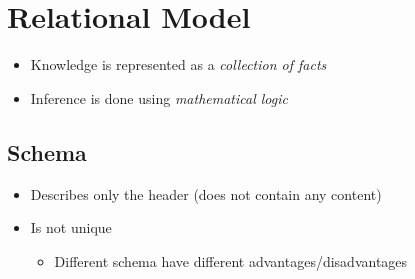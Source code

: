 
\section{Relational Model}
\begin{itemize}
    \item Knowledge is represented as a \textit{collection of facts}
    \item Inference is done using \textit{mathematical logic}
\end{itemize}

\subsection{Schema}
\begin{itemize}
        \begin{itemize}
            \item Set of relation schema
        \end{itemize}
        \begin{itemize}
            \item ``Represented'' as a table
            \item Has a name
            \item Contains a set of fields/attributes
            \item Sometimes referred to as \textit{Relation}
            \item Described as $\text{R}(\text{f}_1: \text{D}_1, \dots, \text{f}_n:\text{D}_n)$
                \begin{itemize}
                     relation name
                     name of field $i$
                     domain of field $i$
                \end{itemize}
        \end{itemize}
        \begin{itemize}
            \item ``Represented'' as a single columns of the table
            \item Has a name
            \item Described by a domain (/type)
        \end{itemize}
    \item Describes only the header (does not contain any content)
    \item Is not unique
        \begin{itemize}
            \item Different schema have different advantages/disadvantages
        \end{itemize}
\end{itemize}

